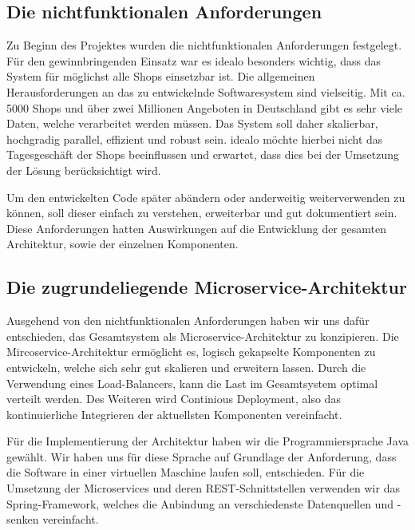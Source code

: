 \subsection{Die nichtfunktionalen Anforderungen}
\label{subsec:nichtfunktionale-anforderungen}

Zu Beginn des Projektes wurden die nichtfunktionalen Anforderungen festgelegt.
Für den gewinnbringenden Einsatz war es idealo besonders wichtig, dass das System für möglichst alle Shops einsetzbar
ist.
Die allgemeinen Herausforderungen an das zu entwickelnde Softwaresystem sind vielseitig.
Mit ca. 5000 Shops und über zwei Millionen Angeboten in Deutschland gibt es sehr viele Daten, welche verarbeitet
werden müssen.
Das System soll daher skalierbar, hochgradig parallel, effizient und robust sein.
idealo möchte hierbei nicht das Tagesgeschäft der Shops beeinflussen und erwartet, dass dies bei der Umsetzung der
Lösung berücksichtigt wird.

Um den entwickelten Code später abändern oder anderweitig weiterverwenden zu können, soll dieser einfach zu
verstehen, erweiterbar und gut dokumentiert sein.
Diese Anforderungen hatten Auswirkungen auf die Entwicklung der gesamten Architektur, sowie der einzelnen Komponenten.

\subsection{Die zugrundeliegende Microservice-Architektur}
\label{subsec:microservice-architektur}

Ausgehend von den nichtfunktionalen Anforderungen haben wir uns dafür entschieden, das Gesamtsystem als
Microservice-Architektur zu konzipieren.
Die Mircoservice-Architektur ermöglicht es, logisch gekapselte Komponenten zu entwickeln, welche sich sehr gut
skalieren und erweitern lassen.
Durch die Verwendung eines Load-Balancers, kann die Last im Gesamtsystem optimal verteilt werden.
Des Weiteren wird Continious Deployment, also das kontinuierliche Integrieren der aktuellsten Komponenten vereinfacht.

Für die Implementierung der Architektur haben wir die Programmiersprache Java gewählt.
Wir haben uns für diese Sprache auf Grundlage der Anforderung, dass die Software in einer virtuellen Maschine laufen
soll, entschieden.
Für die Umsetzung der Microservices und deren REST-Schnittstellen verwenden wir das Spring-Framework, welches die
Anbindung an verschiedenste Datenquellen und -senken vereinfacht.


